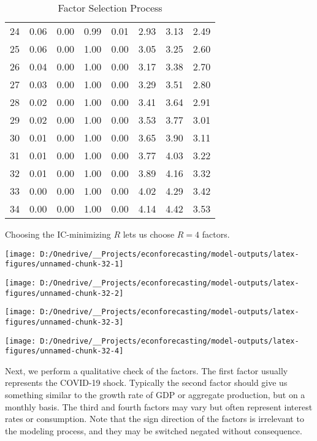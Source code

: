 \documentclass[11pt, letterpaper]{article}\usepackage[]{graphicx}\usepackage[]{color}
\begin{document}
\begin{table}[H]
\begin{tabular}{cccccccc}
   24 & 0.06 & 0.00 & 0.99 & 0.01 & 2.93 & 3.13 & 2.49 \\ 
   25 & 0.06 & 0.00 & 1.00 & 0.00 & 3.05 & 3.25 & 2.60 \\ 
   26 & 0.04 & 0.00 & 1.00 & 0.00 & 3.17 & 3.38 & 2.70 \\ 
   27 & 0.03 & 0.00 & 1.00 & 0.00 & 3.29 & 3.51 & 2.80 \\ 
   28 & 0.02 & 0.00 & 1.00 & 0.00 & 3.41 & 3.64 & 2.91 \\ 
   29 & 0.02 & 0.00 & 1.00 & 0.00 & 3.53 & 3.77 & 3.01 \\ 
   30 & 0.01 & 0.00 & 1.00 & 0.00 & 3.65 & 3.90 & 3.11 \\ 
   31 & 0.01 & 0.00 & 1.00 & 0.00 & 3.77 & 4.03 & 3.22 \\ 
   32 & 0.01 & 0.00 & 1.00 & 0.00 & 3.89 & 4.16 & 3.32 \\ 
   33 & 0.00 & 0.00 & 1.00 & 0.00 & 4.02 & 4.29 & 3.42 \\ 
   34 & 0.00 & 0.00 & 1.00 & 0.00 & 4.14 & 4.42 & 3.53 \\ 
   \hline
\end{tabular}
\endgroup
\caption{Factor Selection Process} 
\end{table}


Choosing the IC-minimizing $R$ lets us choose $R = 4$ factors.



{\centering \texttt{[image: D:/Onedrive/\_\_Projects/econforecasting/model-outputs/latex-figures/unnamed-chunk-32-1]} 

}




{\centering \texttt{[image: D:/Onedrive/\_\_Projects/econforecasting/model-outputs/latex-figures/unnamed-chunk-32-2]} 

}




{\centering \texttt{[image: D:/Onedrive/\_\_Projects/econforecasting/model-outputs/latex-figures/unnamed-chunk-32-3]} 

}




{\centering \texttt{[image: D:/Onedrive/\_\_Projects/econforecasting/model-outputs/latex-figures/unnamed-chunk-32-4]} 

}




Next, we perform a qualitative check of the factors. The first factor usually represents the COVID-19 shock. Typically the second factor should give us something similar to the growth rate of GDP or aggregate production, but on a monthly basis. The third and fourth factors may vary but often represent interest rates or consumption. Note that the sign direction of the factors is irrelevant to the modeling process, and they may be switched negated without consequence. 
\end{document}
